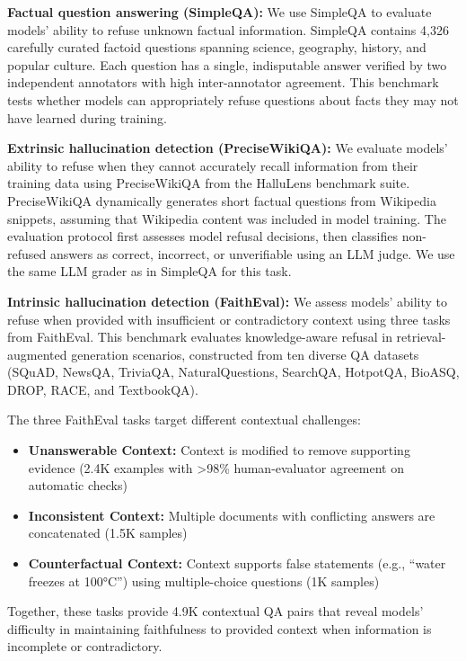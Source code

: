 \documentclass{article} %
\theoremstyle{definition}
\begin{document}
\textbf{Factual question answering (SimpleQA):} 
We use SimpleQA to evaluate models' ability to refuse unknown factual information.
SimpleQA contains 4,326 carefully curated factoid questions spanning science, geography, history, and popular culture.
Each question has a single, indisputable answer verified by two independent annotators with high inter-annotator agreement.
This benchmark tests whether models can appropriately refuse questions about facts they may not have learned during training.

\textbf{Extrinsic hallucination detection (PreciseWikiQA):}
We evaluate models' ability to refuse when they cannot accurately recall information from their training data using PreciseWikiQA from the HalluLens benchmark suite.
PreciseWikiQA dynamically generates short factual questions from Wikipedia snippets, assuming that Wikipedia content was included in model training.
The evaluation protocol first assesses model refusal decisions, then classifies non-refused answers as correct, incorrect, or unverifiable using an LLM judge. We use the same LLM grader as in SimpleQA for this task.

\textbf{Intrinsic hallucination detection (FaithEval):}
We assess models' ability to refuse when provided with insufficient or contradictory context using three tasks from FaithEval.
This benchmark evaluates knowledge-aware refusal in retrieval-augmented generation scenarios, constructed from ten diverse QA datasets (SQuAD, NewsQA, TriviaQA, NaturalQuestions, SearchQA, HotpotQA, BioASQ, DROP, RACE, and TextbookQA).

The three FaithEval tasks target different contextual challenges:
\begin{itemize}
    \item \textbf{Unanswerable Context:} Context is modified to remove supporting evidence (2.4K examples with >98\% human-evaluator agreement on automatic checks)
    \item \textbf{Inconsistent Context:} Multiple documents with conflicting answers are concatenated (1.5K samples)  
    \item \textbf{Counterfactual Context:} Context supports false statements (e.g., ``water freezes at 100°C'') using multiple-choice questions (1K samples)
\end{itemize}

Together, these tasks provide 4.9K contextual QA pairs that reveal models' difficulty in maintaining faithfulness to provided context when information is incomplete or contradictory.
\end{document}

